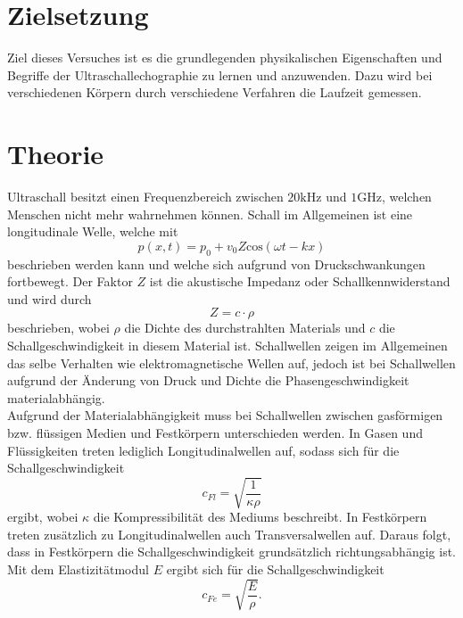 \section{Zielsetzung}
\label{sec:Zielsetzung}
Ziel dieses Versuches ist es die grundlegenden physikalischen Eigenschaften und Begriffe der Ultraschallechographie zu lernen und anzuwenden. 
Dazu wird bei verschiedenen Körpern durch verschiedene Verfahren die Laufzeit gemessen.

\section{Theorie}
\label{sec:Theorie}
Ultraschall besitzt einen Frequenzbereich zwischen $20 \si{\kilo\Hz}$ und $1 \si{\giga\Hz}$, welchen Menschen nicht mehr wahrnehmen können.
Schall im Allgemeinen ist eine longitudinale Welle, welche mit 
\begin{equation*}
    p(x,t) = p_0 + v_0 Z \text{cos}(\omega t - k x)
\end{equation*}
beschrieben werden kann und welche sich aufgrund von Druckschwankungen fortbewegt.
Der Faktor $Z$ ist die akustische Impedanz oder Schallkennwiderstand und wird durch
\begin{equation}
    Z = c \cdot \rho 
    \label{eqn:Impedanz}
\end{equation}
beschrieben, wobei $\rho$ die Dichte des durchstrahlten Materials und $c$ die Schallgeschwindigkeit in diesem Material ist.
Schallwellen zeigen im Allgemeinen das selbe Verhalten wie elektromagnetische Wellen
auf, jedoch ist bei Schallwellen aufgrund der Änderung von Druck und Dichte die
Phasengeschwindigkeit materialabhängig.\\
Aufgrund der Materialabhängigkeit muss bei Schallwellen zwischen gasförmigen bzw. flüssigen Medien und Festkörpern unterschieden werden.
In Gasen und Flüssigkeiten treten lediglich Longitudinalwellen auf, sodass sich für die Schallgeschwindigkeit
\begin{equation}
    c_{Fl} = \sqrt{\frac{1}{\kappa \rho}}
    \label{eqn:cFlüssig}
\end{equation}
ergibt, wobei $\kappa$ die Kompressibilität des Mediums beschreibt.
In Festkörpern treten zusätzlich zu Longitudinalwellen auch Transversalwellen auf. Daraus folgt, dass in Festkörpern die Schallgeschwindigkeit 
grundsätzlich richtungsabhängig ist.
Mit dem Elastizitätmodul $E$ ergibt sich für die Schallgeschwindigkeit
\begin{equation}
    c_{Fe} = \sqrt{\frac{E}{\rho}}.
    \label{eqn:cFest}
\end{equation}
